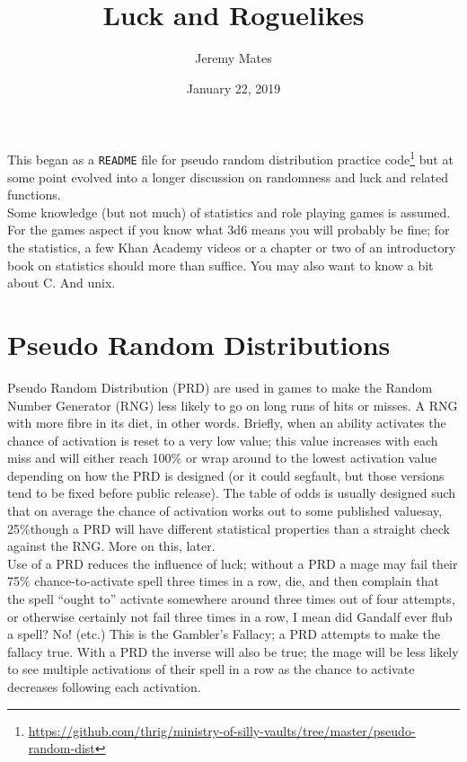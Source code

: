 \documentclass[12pt,a4paper]{article}
\title{Luck and Roguelikes}
\author{Jeremy Mates}
\date{January 22, 2019}
\begin{document}
\maketitle

\setlength{\parindent}{0pt}

This began as a \texttt{README} file for pseudo random distribution
practice
code\footnote{\url{https://github.com/thrig/ministry-of-silly-vaults/tree/master/pseudo-random-dist}}
but at some point evolved into a longer discussion on randomness and
luck and related functions. \\

Some knowledge (but not much) of statistics and role playing games is
assumed. For the games aspect if you know what 3d6 means you will
probably be fine; for the statistics, a few Khan Academy videos or a
chapter or two of an introductory book on statistics should more than
suffice. You may also want to know a bit about C. And unix.

\section*{Pseudo Random Distributions}

Pseudo Random Distribution (PRD) are used in games to make the Random
Number Generator (RNG) less likely to go on long runs of hits or misses.
A RNG with more fibre in its diet, in other words. Briefly, when an
ability activates the chance of activation is reset to a very low value;
this value increases with each miss and will either reach 100\% or wrap
around to the lowest activation value depending on how the PRD is
designed (or it could segfault, but those versions tend to be fixed
before public release). The table of odds is usually designed such that
on average the chance of activation works out to some published
value\textendash say, 25\%\textendash though a PRD will have different
statistical properties than a straight check against the RNG. More on
this, later. \\

Use of a PRD reduces the influence of luck; without a PRD a mage may
fail their 75\% chance-to-activate spell three times in a row, die, and
then complain that the spell ``ought to'' activate somewhere around
three times out of four attempts, or otherwise certainly not fail three
times in a row, I mean did Gandalf ever flub a spell? No!
(etc.) This is the Gambler's Fallacy; a PRD attempts to make
the fallacy true. With a PRD the inverse will also be true; the mage
will be less likely to see multiple activations of their spell in a row
as the chance to activate decreases following each activation. \\
\end{document}
